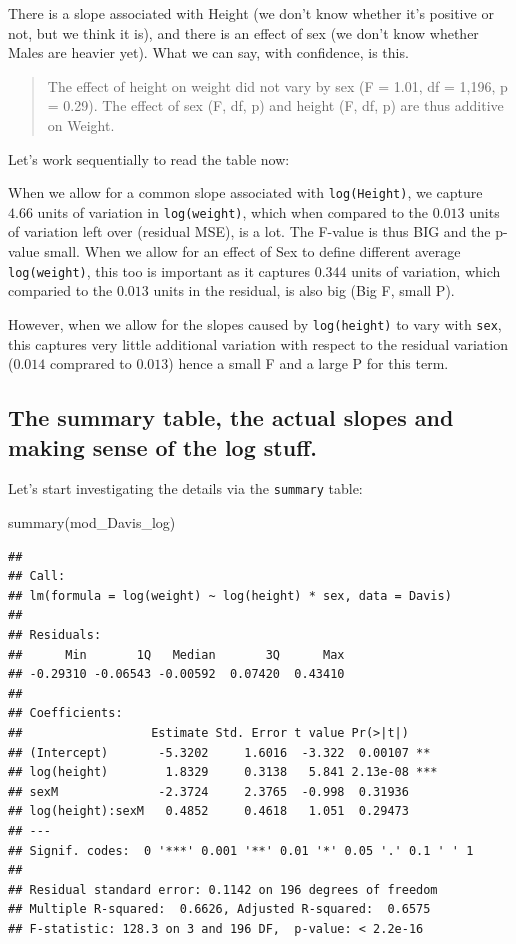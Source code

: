 \documentclass[
]{book}
\newenvironment{Shaded}{\begin{snugshade}}{\end{snugshade}}
\newcommand{\FunctionTok}[1]{\textcolor[rgb]{0.00,0.00,0.00}{#1}}
\newcommand{\NormalTok}[1]{#1}
\begin{document}
There is a slope associated with Height (we don't know whether it's positive or not, but we think it is), and there is an effect of sex (we don't know whether Males are heavier yet). What we can say, with confidence, is this.

\begin{quote}
The effect of height on weight did not vary by sex (F = 1.01, df = 1,196, p = 0.29). The effect of sex (F, df, p) and height (F, df, p) are thus additive on Weight.
\end{quote}

Let's work sequentially to read the table now:

When we allow for a common slope associated with \texttt{log(Height)}, we capture \(4.66\) units of variation in \texttt{log(weight)}, which when compared to the \(0.013\) units of variation left over (residual MSE), is a lot. The F-value is thus BIG and the p-value small. When we allow for an effect of Sex to define different average \texttt{log(weight)}, this too is important as it captures \(0.344\) units of variation, which comparied to the \(0.013\) units in the residual, is also big (Big F, small P).

However, when we allow for the slopes caused by \texttt{log(height)} to vary with \texttt{sex}, this captures very little additional variation with respect to the residual variation (\(0.014\) comprared to \(0.013\)) hence a small F and a large P for this term.

\hypertarget{the-summary-table-the-actual-slopes-and-making-sense-of-the-log-stuff.}{%
\subsection{The summary table, the actual slopes and making sense of the log stuff.}\label{the-summary-table-the-actual-slopes-and-making-sense-of-the-log-stuff.}}

Let's start investigating the details via the \texttt{summary} table:

\begin{Shaded}
\begin{Highlighting}[]
\FunctionTok{summary}\NormalTok{(mod\_Davis\_log)}
\end{Highlighting}
\end{Shaded}

\begin{verbatim}
## 
## Call:
## lm(formula = log(weight) ~ log(height) * sex, data = Davis)
## 
## Residuals:
##      Min       1Q   Median       3Q      Max 
## -0.29310 -0.06543 -0.00592  0.07420  0.43410 
## 
## Coefficients:
##                  Estimate Std. Error t value Pr(>|t|)    
## (Intercept)       -5.3202     1.6016  -3.322  0.00107 ** 
## log(height)        1.8329     0.3138   5.841 2.13e-08 ***
## sexM              -2.3724     2.3765  -0.998  0.31936    
## log(height):sexM   0.4852     0.4618   1.051  0.29473    
## ---
## Signif. codes:  0 '***' 0.001 '**' 0.01 '*' 0.05 '.' 0.1 ' ' 1
## 
## Residual standard error: 0.1142 on 196 degrees of freedom
## Multiple R-squared:  0.6626, Adjusted R-squared:  0.6575 
## F-statistic: 128.3 on 3 and 196 DF,  p-value: < 2.2e-16
\end{verbatim}
\end{document}
